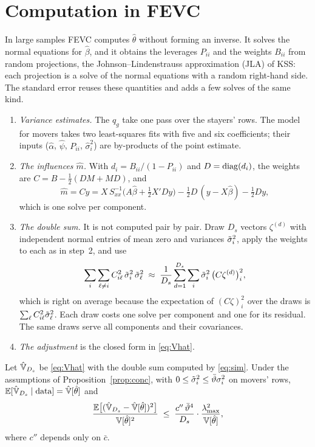 \section{Computation in FEVC}\label{sec:computation}

In large samples FEVC computes $\hat\theta$ without forming an inverse. It solves the normal equations for
$\hat\beta$, and it obtains the leverages $P_{ii}$ and the weights $B_{ii}$ from random projections, the
Johnson--Lindenstrauss approximation (JLA) of KSS: each projection is a solve of the normal equations with a
random right-hand side. The standard error reuses these quantities and adds a few solves of the same kind.

\begin{enumerate}
\item \emph{Variance estimates.} The $q_g$ take one pass over the stayers' rows. The model for movers takes two
least-squares fits with five and six coefficients; their inputs ($\hat\alpha$, $\hat\psi$, $P_{ii}$,
$\hat\sigma_i^2$) are by-products of the point estimate.
\item \emph{The influences $\hat m$.} With $d_i=B_{ii}/(1-P_{ii})$ and $D=\operatorname{diag}(d_i)$, the weights are
$C=B-\frac12(DM+MD)$, and
\[
\hat m=Cy=X\,S_{xx}^{-1}\big(A\hat\beta+\tfrac12X'Dy\big)-\tfrac12D\,(y-X\hat\beta)-\tfrac12Dy ,
\]
which is one solve per component.
\item \emph{The double sum.} It is not computed pair by pair. Draw $D_s$ vectors $\zeta^{(d)}$ with
independent normal entries of mean zero and variances $\tilde\sigma_i^2$, apply the weights to each as in step~2, and
use
\begin{equation}\label{eq:sim}
\sum_i\sum_{\ell\ne i}C_{i\ell}^2\,\tilde\sigma_i^2\,\tilde\sigma_\ell^2\;\approx\;
\frac{1}{D_s}\sum_{d=1}^{D_s}\sum_i\tilde\sigma_i^2\,\big(C\zeta^{(d)}\big)_i^{2} ,
\end{equation}
which is right on average because the expectation of $(C\zeta)_i^2$ over the draws is
$\sum_\ell C_{i\ell}^2\tilde\sigma_\ell^2$. Each draw costs one solve per component and one for its residual. The same
draws serve all components and their covariances.
\item \emph{The adjustment} is the closed form in \eqref{eq:Vhat}.
\end{enumerate}

\begin{proposition}\label{prop:sim}
Let $\hat{\mathbb{V}}_{D_s}$ be \eqref{eq:Vhat} with the double sum computed by \eqref{eq:sim}. Under the assumptions of
Proposition~\ref{prop:conc}, with $0\le\tilde\sigma_i^2\le\bar\vartheta\sigma_i^2$ on movers' rows,
$\mathbb{E}[\hat{\mathbb{V}}_{D_s}\mid\text{data}]=\hat{\mathbb{V}}[\hat\theta]$ and
\[
\frac{\mathbb{E}\big[(\hat{\mathbb{V}}_{D_s}-\hat{\mathbb{V}}[\hat\theta])^2\big]}{\mathbb{V}[\hat\theta]^2}\;\le\;\frac{c''\,\bar\vartheta^4}{D_s}\cdot\frac{\lambda_{\max}^2}{\mathbb{V}[\hat\theta]} ,
\]
where $c''$ depends only on $\bar c$.
\end{proposition}

